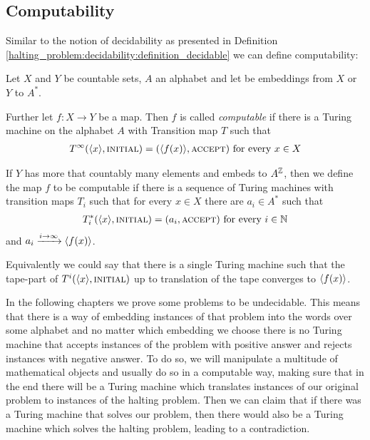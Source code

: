 \subsection{Computability}
\label{halting_problem:computability}

Similar to the notion of decidability as presented in Definition \ref{halting_problem:decidability:definition_decidable} we can define computability:

\begin{Definition}
	Let $X$ and $Y$ be countable sets, $A$ an alphabet and let \emb{\cdot} be embeddings from $X$ or $Y$ to $A^*$.

	Further let $f:X \to Y$ be a map.
	Then $f$ is called \emph{computable} if there is a Turing machine on the alphabet $A$ with Transition map $T$ such that
	\begin{align*}
		T^\infty(\langle x \rangle,\text{\scshape{initial}}) = (\langle f(x) \rangle,\text{\scshape{accept}}) ~\text{for every}~ x \in X
	\end{align*}
\end{Definition}

\begin{Remark}
	If $Y$ has more that countably many elements and embeds to $A^{\mathbb{Z}}$, then we define the map $f$ to be computable if there is a sequence of Turing machines with transition maps $T_i$ such that for every $x \in X$ there are $a_i \in A^*$ such that
	\begin{align*}
		T_i^*(\langle x \rangle, \text{\scshape{initial}}) = (a_i,\text{\scshape{accept}}) ~\text{for every}~ i \in \mathbb{N}
	\end{align*}
	and $a_i \xrightarrow{i \to \infty} \langle f(x) \rangle$.

	Equivalently we could say that there is a single Turing machine such that the tape-part of $T^i(\langle x \rangle,\text{\scshape{initial}})$ up to translation of the tape converges to $\langle f(x) \rangle$.
\end{Remark}

In the following chapters we prove some problems to be undecidable.
This means that there is a way of embedding instances of that problem into the words over some alphabet and no matter which embedding we choose there is no Turing machine that accepts instances of the problem with positive answer and rejects instances with negative answer.
To do so, we will manipulate a multitude of mathematical objects and usually do so in a computable way, making sure that in the end there will be a Turing machine which translates instances of our original problem to instances of the halting problem.
Then we can claim that if there was a Turing machine that solves our problem, then there would also be a Turing machine which solves the halting problem, leading to a contradiction.

